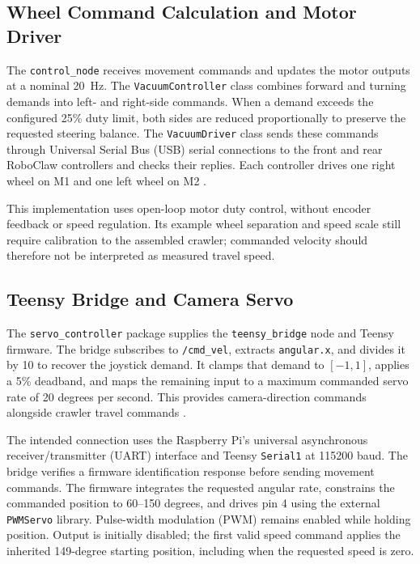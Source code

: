 \subsection{Wheel Command Calculation and Motor Driver}
\label{sec:wheel-control-driver}
The \texttt{control\_node} receives movement commands and updates the motor outputs at a nominal 20~Hz. The \texttt{VacuumController} class combines forward and turning demands into left- and right-side commands. When a demand exceeds the configured 25\% duty limit, both sides are reduced proportionally to preserve the requested steering balance. The \texttt{VacuumDriver} class sends these commands through Universal Serial Bus (USB) serial connections to the front and rear RoboClaw controllers and checks their replies. Each controller drives one right wheel on M1 and one left wheel on M2 \citep{hernandezVacuumCrawler2026}.

This implementation uses open-loop motor duty control, without encoder feedback or speed regulation. Its example wheel separation and speed scale still require calibration to the assembled crawler; commanded velocity should therefore not be interpreted as measured travel speed.
\subsection{Teensy Bridge and Camera Servo}
\label{sec:teensy-servo}
The \texttt{servo\_controller} package supplies the \texttt{teensy\_bridge} node and Teensy firmware. The bridge subscribes to \texttt{/cmd\_vel}, extracts \texttt{angular.x}, and divides it by 10 to recover the joystick demand. It clamps that demand to $[-1,1]$, applies a 5\% deadband, and maps the remaining input to a maximum commanded servo rate of 20 degrees per second. This provides camera-direction commands alongside crawler travel commands \citep{hernandezVacuumCrawler2026}.

The intended connection uses the Raspberry Pi's universal asynchronous receiver/transmitter (UART) interface and Teensy \texttt{Serial1} at 115200 baud. The bridge verifies a firmware identification response before sending movement commands. The firmware integrates the requested angular rate, constrains the commanded position to 60--150 degrees, and drives pin 4 using the external \texttt{PWMServo} library. Pulse-width modulation (PWM) remains enabled while holding position. Output is initially disabled; the first valid speed command applies the inherited 149-degree starting position, including when the requested speed is zero.

